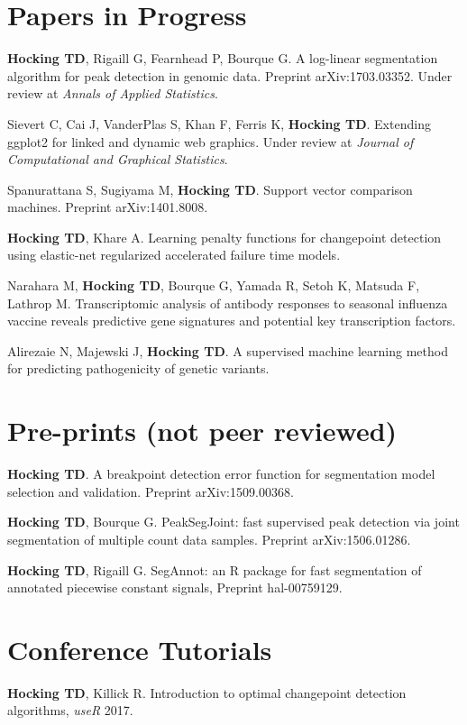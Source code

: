 \documentclass[margin,line]{res}
\begin{document}
\begin{resume}
\section{\sc Papers in Progress}

{\bf Hocking TD}, Rigaill G, Fearnhead P, Bourque G. A log-linear
segmentation algorithm for peak detection in genomic data. Preprint
arXiv:1703.03352. Under review at {\it Annals of Applied Statistics}.

Sievert C, Cai J, VanderPlas S, Khan F, Ferris K, {\bf Hocking
  TD}. Extending ggplot2 for linked and dynamic web graphics. Under
review at {\it Journal of Computational and Graphical Statistics}.

Spanurattana S, Sugiyama M, {\bf Hocking TD}. Support vector
comparison machines. Preprint arXiv:1401.8008. 

{\bf Hocking TD}, Khare A. Learning penalty functions for changepoint
detection using elastic-net regularized accelerated failure time
models.

Narahara M, {\bf Hocking TD}, Bourque G, Yamada R, Setoh K, Matsuda F,
Lathrop M. Transcriptomic analysis of antibody responses to seasonal
influenza vaccine reveals predictive gene signatures and potential key
transcription factors.

Alirezaie N, Majewski J, {\bf Hocking TD}. A supervised machine
learning method for predicting pathogenicity of genetic variants.

\section{\sc Pre-prints (not peer reviewed)}

{\bf Hocking TD}. A breakpoint detection error function for
segmentation model selection and validation. Preprint
arXiv:1509.00368.

{\bf Hocking TD}, Bourque G. PeakSegJoint: fast supervised peak
detection via joint segmentation of multiple count data
samples. Preprint arXiv:1506.01286.

{\bf Hocking TD}, Rigaill G. SegAnnot: an R package for fast
segmentation of annotated piecewise constant signals, Preprint
hal-00759129.

\section{\sc Conference Tutorials}

{\bf Hocking TD}, Killick R. Introduction to optimal changepoint detection algorithms, {\it useR} 2017.


\end{resume}
\end{document}

